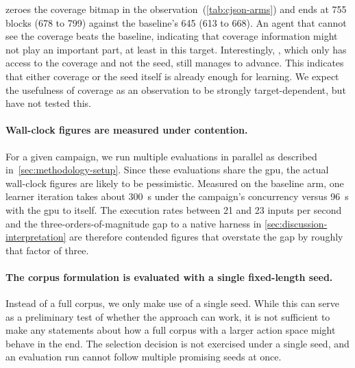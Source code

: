  zeroes the coverage bitmap in the
observation~(\cref{tab:cjson-arms}) and ends at \num{755} blocks (\num{678} to
\num{799}) against the baseline's
\num{645} (\num{613} to \num{668}).
An agent that cannot see the coverage beats the baseline, indicating that
coverage information might not play an important part, at least in this target.
Interestingly, , which only has access to the coverage and not the seed,
still manages to advance.
This indicates that either coverage or the seed itself is already enough for learning.
We expect the usefulness of coverage as an observation to be strongly
target-dependent, but have not tested this.

\paragraph{Wall-clock figures are measured under contention.}
For a given campaign, we run multiple evaluations in parallel as described in~\cref{sec:methodology-setup}.
Since these evaluations share the \gls{gpu}, the actual wall-clock figures are likely to be
pessimistic.
Measured on the baseline arm, one learner iteration takes about \SI{300}{\second} under the
campaign's concurrency versus \SI{96}{\second} with the \gls{gpu} to itself.
The execution rates between \num{21} and \num{23} inputs per second and the three-orders-of-magnitude
gap to a native harness in \cref{sec:discussion-interpretation} are therefore contended figures that
overstate the gap by roughly that factor of three.

\paragraph{The corpus formulation is evaluated with a single fixed-length seed.}
Instead of a full corpus, we only make use of a single seed.
While this can serve as a preliminary test of whether the approach can work, it
is not sufficient to make any statements about how a full corpus with a larger action space might behave
in the end.
The selection decision is not exercised under a single seed, and an evaluation run
cannot follow multiple promising seeds at once.
